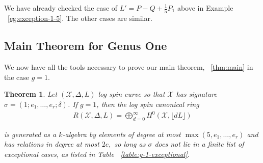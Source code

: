 \documentclass{amsart}
\theoremstyle{plain}
\newtheorem{thm}{Theorem}[section]
\theoremstyle{definition}
\newtheorem{example}[thm]{Example}
\theoremstyle{remark}
\numberwithin{equation}{section}
\newcommand\ssec{\subsection}
\DeclareMathOperator\di{Div}
\newcommand\sx{\mathscr X}
\newcommand{\halfcan}{L}
\begin{document}
We have already checked the case of 
$L' = P - Q + \frac{1}{5}P_1$ above in Example ~\ref{eg:exception-1-5}. The other cases are similar.


%
%
%


\ssec{Main Theorem for Genus One}
\label{ssec:main_g_1}

We now have all the tools necessary to prove our main theorem, ~\ref{thm:main} in the case $g = 1$. 

\begin{thm}
\label{thm:g-1-main}
Let $(\sx, \Delta, \halfcan)$ log spin curve so that $\sx$ has signature $\sigma = (1; e_1, \ldots, e_r; \delta)$.
If $g = 1$, then the log spin canonical ring
\begin{align*}
	R(\sx, \Delta, \halfcan) = \bigoplus_{d = 0}^\infty H^0(\sx, \lfloor d L \rfloor)
\end{align*}

\noindent
is generated as a $k$-algebra by elements of degree at most $\max(5, e_1, \ldots, e_r)$ and has relations in degree at most $2e,$ so long as $\sigma$ does not lie in a
finite list of exceptional cases, as listed in Table
~\ref{table:g-1-exceptional}.
\end{thm}
\end{document}
